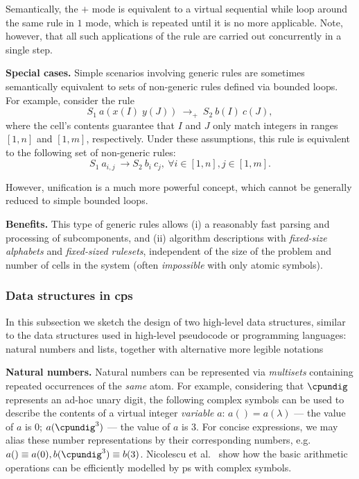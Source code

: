 Semantically, the $+$ mode is equivalent to a virtual sequential while loop around the same rule in $1$ mode, which is repeated until it is no more applicable.  Note, however, that all such applications of the rule are carried out concurrently in a single step.

\smallskip
\noindent
\textbf{Special cases.}
Simple scenarios involving generic rules are sometimes 
semantically equivalent to sets of non-generic rules defined via bounded loops.
For example, consider the rule
$$
S_1 ~ a(x(I) \; y(J)) ~ \rightarrow_+ ~ S_2 ~ b(I) ~ c(J),
$$
where the cell's contents guarantee that $I$ and $J$ 
only match integers in ranges $[1,n]$ and $[1,m]$, respectively.
Under these assumptions, 
this rule is equivalent to the following set of non-generic rules:
$$
S_1 ~ a_{i,j} ~ \rightarrow S_2 ~ b_i ~ c_j, ~ \forall i \in [1,n], j \in [1,m].
$$

However, unification is a much more powerful concept, 
which cannot be generally reduced to simple bounded loops.

\smallskip
\noindent
\textbf{Benefits.}
This type of generic rules allows (i) a reasonably fast parsing and processing of subcomponents, and
(ii) algorithm descriptions with \emph{fixed-size alphabets} and \emph{fixed-sized rulesets}, 
independent of the size of the problem and number of cells in the system (often \emph{impossible} with only atomic symbols).


\subsubsection{Data structures in \gls{cps}}\label{sec-data-structures}

In this subsection we sketch the design of two high-level data structures, 
similar to the data structures used in high-level pseudocode or %
programming languages:
natural numbers and lists, together with alternative more legible notations

\medskip
\noindent
\textbf{Natural numbers.} Natural numbers can be represented via \emph{multisets} containing repeated occurrences of the \emph{same} atom.
For example, considering that $\cpundig$ represents an ad-hoc unary digit, 
the following complex symbols can be used to describe 
the contents of a virtual integer \emph{variable} $a$: 
$a () = a(\lambda)$ --- the value of $a$ is 0;
$a(\cpundig^3)$ --- the value of $a$ is 3.
For concise expressions, we may alias these number representations by their corresponding numbers, e.g.~$a() \equiv a(0), b(\cpundig^3) \equiv b(3)$.
Nicolescu et al.~\cite{Nicolescu2014,RN-HW-ROMJIST14} show how the basic arithmetic operations can be efficiently modelled by \gls{ps} with complex symbols.

